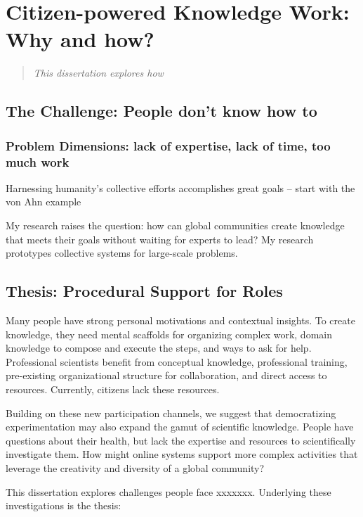 \chapter{Citizen-powered Knowledge Work: Why and how?}

\begin{quote}
\emph{This dissertation explores how }
\end{quote}
\vspace{0.25in}


\section{The Challenge: People don't know how to}
\subsection{Problem Dimensions: lack of expertise, lack of time, too much work}
Harnessing humanity's collective efforts accomplishes great goals
-- start with the von Ahn example

My research raises the question: how can global communities create knowledge that meets their goals without waiting for experts to lead? My research prototypes collective systems for large-scale problems.

\section{Thesis: Procedural Support for Roles}

Many people have strong personal motivations and contextual insights. To create knowledge,
they need mental scaffolds for organizing complex work, domain knowledge to compose and
execute the steps, and ways to ask for help. Professional scientists benefit from conceptual
knowledge, professional training, pre-existing organizational structure for collaboration, and direct access to resources. Currently, citizens lack these resources.

Building on these new participation channels, we suggest that democratizing experimentation may
also expand the gamut of scientific knowledge. People have questions about their health, but lack
the expertise and resources to scientifically investigate them. How might online systems support
more complex activities that leverage the creativity and diversity of a global community?

This dissertation explores challenges people face xxxxxxx. Underlying these investigations is the thesis:

